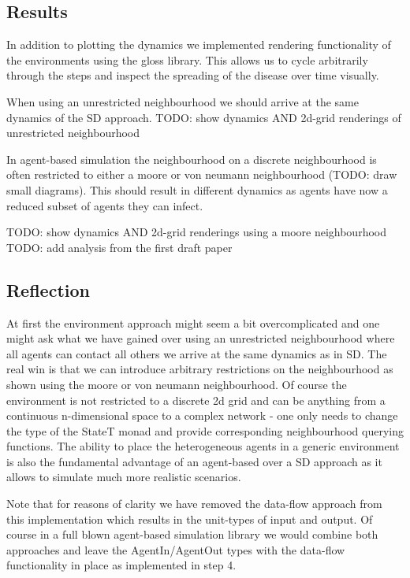 \subsection{Results}
In addition to plotting the dynamics we implemented rendering functionality of the environments using the gloss library. This allows us to cycle arbitrarily through the steps and inspect the spreading of the disease over time visually.

When using an unrestricted neighbourhood we should arrive at the same dynamics of the SD approach.
TODO: show dynamics AND 2d-grid renderings of unrestricted neighbourhood

In agent-based simulation the neighbourhood on a discrete neighbourhood is often restricted to either a moore or von neumann neighbourhood (TODO: draw small diagrams). This should result in different dynamics as agents have now a reduced subset of agents they can infect.

TODO: show dynamics AND 2d-grid renderings using a moore neighbourhood
TODO: add analysis from the first draft paper

\subsection{Reflection}
At first the environment approach might seem a bit overcomplicated and one might ask what we have gained over using an unrestricted neighbourhood where all agents can contact all others we arrive at the same dynamics as in SD. The real win is that we can introduce arbitrary restrictions on the neighbourhood as shown using the moore or von neumann neighbourhood. 
Of course the environment is not restricted to a discrete 2d grid and can be anything from a continuous n-dimensional space to a complex network - one only needs to change the type of the StateT monad and provide corresponding neighbourhood querying functions. The ability to place the heterogeneous agents in a generic environment is also the fundamental advantage of an agent-based over a SD approach as it allows to simulate much more realistic scenarios.

Note that for reasons of clarity we have removed the data-flow approach from this implementation which results in the unit-types of input and output. Of course in a full blown agent-based simulation library we would combine both approaches and leave the AgentIn/AgentOut types with the data-flow functionality in place as implemented in step 4.

